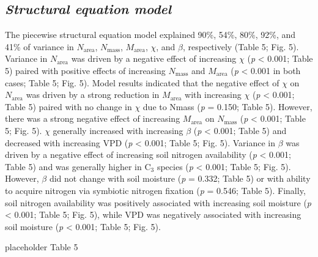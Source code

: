 \subsection{\textit{Structural equation model}}
The piecewise structural equation model explained 90\%, 54\%, 80\%, 92\%, and 41\% of variance in $N_\mathrm{area}$, $N_\mathrm{mass}$, $M_\mathrm{area}$, $\chi$, and $\beta$, respectively (Table 5; Fig. 5). Variance in $N_\mathrm{area}$ was driven by a negative effect of increasing $\chi$ (\textit{p} < 0.001; Table 5) paired with positive effects of increasing $N_\mathrm{mass}$ and $M_\mathrm{area}$ (\textit{p} < 0.001 in both cases; Table 5; Fig. 5). Model results indicated that the negative effect of $\chi$ on $N_\mathrm{area}$ was driven by a strong reduction in $M_\mathrm{area}$ with increasing $\chi$ (\textit{p} < 0.001; Table 5) paired with no change in $\chi$ due to Nmass (\textit{p} = 0.150; Table 5). However, there was a strong negative effect of increasing $M_\mathrm{area}$ on $N_\mathrm{mass}$ (\textit{p} < 0.001; Table 5; Fig. 5). $\chi$ generally increased with increasing $\beta$  (\textit{p} < 0.001; Table 5) and decreased with increasing VPD (\textit{p} < 0.001; Table 5; Fig. 5). Variance in $\beta$  was driven by a negative effect of increasing soil nitrogen availability (\textit{p} < 0.001; Table 5) and was generally higher in C$_3$ species (\textit{p} < 0.001; Table 5; Fig. 5). However, $\beta$ did not change with soil moisture (\textit{p} = 0.332; Table 5) or with ability to acquire nitrogen via symbiotic nitrogen fixation (\textit{p} = 0.546; Table 5). Finally, soil nitrogen availability was positively associated with increasing soil moisture (\textit{p} < 0.001; Table 5; Fig. 5), while VPD was negatively associated with increasing soil moisture (\textit{p} < 0.001; Table 5; Fig. 5).

\newpage
placeholder Table 5
\clearpage


